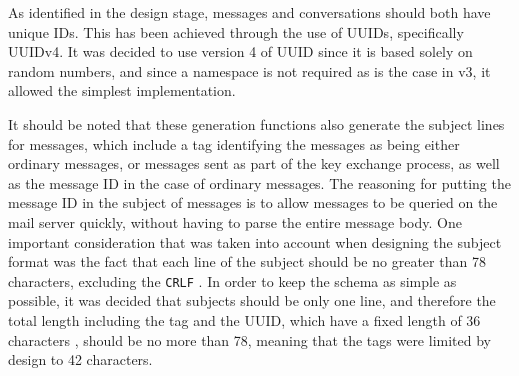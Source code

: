 As identified in the design stage, messages and conversations should both have unique IDs. This has been achieved through the use of UUIDs, specifically UUIDv4. It was decided to use version 4 of UUID since it is based solely on random numbers, and since a namespace is not required as is the case in v3, it allowed the simplest implementation.

It should be noted that these generation functions also generate the subject lines for messages, which include a tag identifying the messages as being either ordinary messages, or messages sent as part of the key exchange process, as well as the message ID in the case of ordinary messages. The reasoning for putting the message ID in the subject of messages is to allow messages to be queried on the mail server quickly, without having to parse the entire message body. One important consideration that was taken into account when designing the subject format was the fact that each line of the subject should be no greater than 78 characters, excluding the \verb|CRLF| \cite{internet-message-format-rfc}. In order to keep the schema as simple as possible, it was decided that subjects should be only one line, and therefore the total length including the tag and the UUID, which have a fixed length of 36 characters \cite{uuid-rfc}, should be no more than 78, meaning that the tags were limited by design to 42 characters.